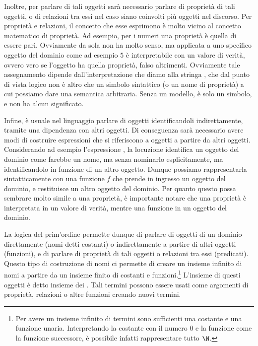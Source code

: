 Inoltre, per parlare di tali oggetti sarà necessario parlare di proprietà di tali oggetti, o di relazioni tra essi nel caso siano coinvolti più oggetti nel discorso. Per proprietà e relazioni, il concetto che esse esprimono è molto vicino al concetto matematico di proprietà. Ad esempio, per i numeri una proprietà è quella di essere pari. Ovviamente da sola non ha molto senso, ma applicata a uno specifico oggetto del dominio come ad esempio \(5\) è interpretabile con un valore di verità, ovvero vero se l'oggetto ha quella proprietà, falso altrimenti. Ovviamente tale assegnamento dipende dall'interpretazione che diamo alla stringa , che dal punto di vista logico non è altro che un simbolo sintattico (o un nome di proprietà) a cui possiamo dare una semantica arbitraria. Senza un modello,  è solo un simbolo, e non ha alcun significato.

Infine, è usuale nel linguaggio parlare di oggetti identificandoli indirettamente, tramite una dipendenza con altri oggetti. Di conseguenza sarà necessario avere modi di costruire espressioni che si riferiscono a oggetti a partire da altri oggetti. Considerando ad esempio l'espressione , la locuzione  identifica un oggetto del dominio come farebbe un nome, ma senza nominarlo esplicitamente, ma identificandolo in funzione di un altro oggetto. Dunque possiamo rappresentarla sintatticamente con una funzione \(f\) che prende in ingresso un oggetto del dominio, e restituisce un altro oggetto del dominio. Per quanto questo possa sembrare molto simile a una proprietà, è importante notare che una proprietà è interpretata in un valore di verità, mentre una funzione in un oggetto del dominio. 

La logica del prim'ordine permette dunque di parlare di oggetti di un dominio direttamente (nomi detti costanti) o indirettamente a partire di altri oggetti (funzioni), e di parlare di proprietà di tali oggetti o relazioni tra essi (predicati). Questo tipo di costruzione di nomi ci permette di creare un insieme infinito di nomi a partire da un insieme finito di costanti e funzioni.\footnote{Per avere un insieme infinito di termini sono sufficienti una costante e una funzione unaria. Interpretando la costante con il numero \(0\) e la funzione come la funzione successore, è possibile infatti rappresentare tutto \(\N\).} L'insieme di questi oggetti è detto insieme dei . Tali termini possono essere usati come argomenti di proprietà, relazioni o altre funzioni creando nuovi termini.

